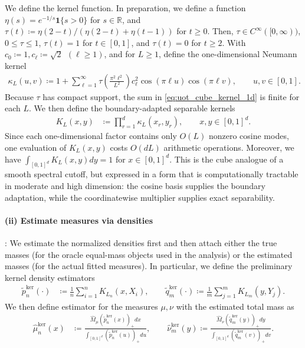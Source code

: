 \documentclass[11pt,reqno]{amsart}
\theoremstyle{definition}
\newcommand{\R}{\mathbb{R}}
\renewcommand{\hat}{\widehat}
\renewcommand{\tilde}{\widetilde}
\begin{document}
We define the kernel function. In preparation, we define a function $\eta(s)  = e^{-1/s} \mathbf{1}\{s > 0\}$ for $s \in \R$, and $\tau(t)
    \coloneqq
    {\eta(2-t)} / ({\eta(2-t)+\eta(t-1)})$ for $t\ge 0$.
Then, $\tau\in C^\infty([0,\infty))$, $0\le \tau\le 1$, $\tau(t)=1$ for $t\in[0,1]$, and $\tau(t)=0$ for $t\ge 2$.
With $c_0 \coloneqq 1,
    c_{\ell} \coloneqq \sqrt{2}\ \ (\ell\ge 1)$, 
and for $L\ge 1$, define the one-dimensional Neumann kernel
\begin{align}
\label{eq:uot_cube_kernel_1d}
    \kappa_L(u,v)
    \coloneqq
    1+\sum_{\ell=1}^{\infty}
    \tau \left(\frac{\pi^2 \ell^2}{L^2}\right)c_\ell^2
    \cos(\pi \ell u)\cos(\pi \ell v),
    \qquad
    u,v\in[0,1].
\end{align}
Because $\tau$ has compact support, the sum in \eqref{eq:uot_cube_kernel_1d} is finite for each $L$. We then define the boundary-adapted separable kernels
\begin{align}
\label{eq:uot_cube_kernel}
    K_L(x,y)
    &\coloneqq
    \prod_{r=1}^d \kappa_L(x_r,y_r),
    \qquad x,y\in[0,1]^d.
\end{align}
Since each one-dimensional factor contains only $O(L)$ nonzero cosine modes, one evaluation of $K_L(x,y)$ costs $O(dL)$ arithmetic operations. Moreover, we have $\int_{[0,1]^d} K_L(x,y) dy = 1$ for $ x\in[0,1]^d$.
This is the cube analogue of a smooth spectral cutoff, but expressed in a form that is computationally tractable in moderate and high dimension: the cosine basis supplies the boundary adaptation, while the coordinatewise multiplier supplies exact separability.


\paragraph{(ii) Estimate measures via densities}:
We estimate the normalized densities first and then attach either the true masses (for the oracle equal-mass objects used in the analysis) or the estimated masses (for the actual fitted measures).
In particular, we define the preliminary kernel density estimators
\begin{align}
    \tilde p_n^{\mathrm{ker}}(\cdot)
    &\coloneqq
    \frac{1}{n}\sum_{i=1}^n K_{L_n}(x,X_i),
    \qquad
    \tilde q_m^{\mathrm{ker}}(\cdot)
    \coloneqq
    \frac{1}{m}\sum_{j=1}^m K_{L_m}(y,Y_j).
\end{align}
We then define estimator for the measures $\mu,\nu$ with the estimated total mass as
\begin{align}
    \hat \mu_n^{\mathrm{ker}}(x)
    &\coloneqq
    \frac{\hat{M}_\mu (\tilde p_n^{\mathrm{ker}}(x))_+ dx}
    {\int_{[0,1]^d}(\tilde p_n^{\mathrm{ker}}(u))_+ du},
    \qquad
    \hat \nu_m^{\mathrm{ker}}(y)
    \coloneqq
    \frac{ \hat{M}_\nu(\tilde q_m^{\mathrm{ker}}(y))_+ dy}
    {\int_{[0,1]^d}(\tilde q_m^{\mathrm{ker}}(v))_+ dv}.
\end{align}
\end{document}
